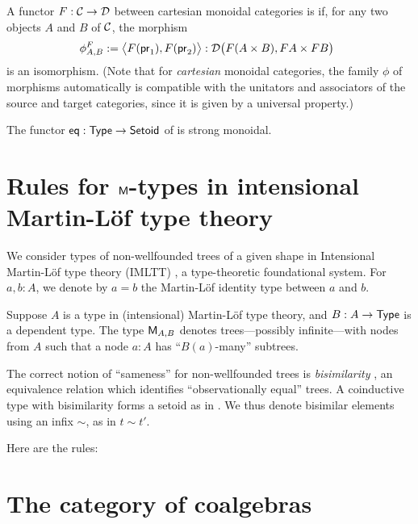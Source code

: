 \documentclass[envcountsame]{llncs}
\begin{document}
\begin{definition}\label{def:monoidal_functor}
 A functor $F:{\mathcal{C}}\to\mathcal{D}$ between cartesian monoidal categories is  if, for any two objects $A$ and $B$ of ${\mathcal{C}}$,
  the morphism
 \[ \phi^F_{A,B} := \bigl\langle F(\mathsf{pr}_1), F(\mathsf{pr}_2) \bigr\rangle : \mathcal{D}\bigl(F(A\times B), FA\times FB\bigr)\enspace  \] 
 is an isomorphism.
 (Note that for \emph{cartesian} monoidal categories, the family $\phi$ of morphisms automatically 
  is compatible with the unitators and associators of the source and target categories, 
  since it is given by a universal property.)
\end{definition}

\begin{example}
  The functor $\mathsf{eq}: \mathsf{Type} \to \mathsf{Setoid}$ of  is strong monoidal.
\end{example}


\section{Rules for $\mathsf{M}$-types in intensional Martin-L\"of type theory}\label{sec:rules}

We consider types of non-wellfounded trees of a given shape in Intensional Martin-L\"of type theory (IMLTT) \parencite{martin_lof}, 
a type-theoretic foundational system.
For $a,b : A$, we denote by $a = b$ the Martin-L\"of identity type between $a$ and $b$.


Suppose $A$ is a type in (intensional) Martin-L\"of type theory, and $B : A \to \mathsf{Type}$ is a dependent type.
The type $\mathsf{M}_{A,B}$ denotes trees---possibly infinite---with nodes 
from $A$ such that a node $a:A$ has \enquote{$B(a)$-many} subtrees.

The correct notion of \enquote{sameness} for non-wellfounded trees is \emph{bisimilarity} 
\parencite{DBLP:conf/types/Coquand93, DBLP:journals/corr/abs-cs-0603119},
an equivalence relation which identifies \enquote{observationally equal} trees.
A coinductive type with bisimilarity forms a setoid as in .
We thus denote bisimilar elements using an infix $\sim$, as in $t \sim t'$. 

Here are the rules:





\section{The category of coalgebras}
\end{document}
